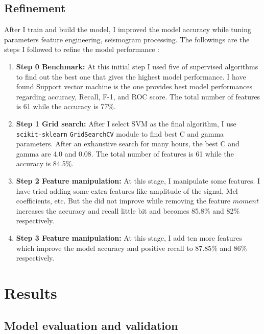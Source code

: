 \documentclass[12pt]{article}
\begin{document}
    
        \subsection{Refinement}
    
        After I train and build the model, I improved the model accuracy while tuning parameters feature engineering, seismogram processing. The followings are the steps I followed to refine the model performance :
    
        \begin{enumerate}
            \item \textbf{Step 0 Benchmark:} At this initial step I used five of supervised algorithms to find out the best one that gives the highest model performance. I have found Support vector machine is the one provides best model performances regarding accuracy, Recall, F-1, and ROC score. The total number of features is 61 while the accuracy is 77$\%$.
    
            \item \textbf{Step 1 Grid search:} After I select SVM as the final algorithm, I use \texttt{scikit-sklearn} \texttt{GridSearchCV} module to find best C and gamma parameters. After an exhaustive search for many hours, the best C and gamma are 4.0 and 0.08. The total number of features is 61 while the accuracy is 84.5$\%$. 
    
            \item \textbf{Step 2 Feature manipulation:} At this stage, I manipulate some features. I have tried adding some extra features like amplitude of the signal, Mel coefficients, etc. But the did not improve while removing the feature $moment$ increases the accuracy and recall little bit and becomes 85.8$\%$ and 82$\%$ respectively.
    
            \item \textbf{Step 3 Feature manipulation:} At this stage, I add ten more features which improve the model accuracy and positive recall to 87.85$\%$ and 86$\%$ respectively.
    
        \end{enumerate}
    
        \section{Results}
        \subsection{Model evaluation and validation}
        
\end{document}
